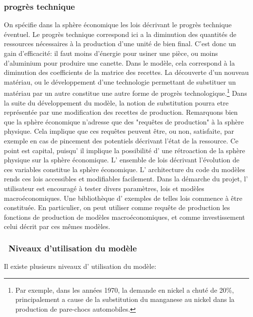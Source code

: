 \documentclass[12pt,a4paper]{article}%
\begin{document}
\subsubsection{{progrès technique}}

On spécifie dans la sphère économique les lois décrivant le progrès
technique éventuel. Le progrès technique correspond ici a la diminution
des quantités de ressources nécessaires à la production d'une unité de
bien final. C'est donc un gain d'efficacité: il faut moins d'énergie pour
usiner une pièce, ou moins d'aluminium pour produire une canette. Dans le
modèle, cela correspond à la diminution des coefficients de la matrice
des recettes. La découverte d'un nouveau matériau, ou le développement d'une
technologie permettant de substituer un matériau par un autre constitue une
autre forme de progrès technologique.\footnote{Par exemple, dans les années
1970, la demande en nickel a chuté de 20\%, principalement a cause de la
substitution du manganese au nickel dans la production de pare-chocs
automobiles\cite{Godard1980}.} Dans la suite du développement du modèle,
la notion de substitution pourra etre représentée par une modification des
recettes de production. Remarquons bien que la sphère économique n'adresse
que des "requêtes de production" à la sphère physique. Cela implique
que ces requêtes peuvent être, ou non, satisfaite, par exemple en cas de
pincement des potentiels décrivant l'état de la ressource. Ce point est
capital, puisqu' il implique la possibilité d' une rétroaction de la
sphère physique sur la sphère économique. L' ensemble de lois
décrivant l'évolution de ces variables constitue la sphère économique. L'
architecture du code du modèles rends ces lois accessibles et modifiables
facilement. Dans la démarche du projet, l' utilisateur est encouragé à
tester divers paramètres, lois et modèles macroéconomiques. Une
bibliothèque d' exemples de telles lois commence à être constituée. En
particulier, on peut utiliser comme requête de production les fonctions de
production de modèles macroéconomiques, et comme investissement celui
décrit par ces mêmes modèles.

\subsubsection{\ Niveaux d'utilisation du modèle}

Il existe plusieurs niveaux d' utilisation du modèle:
\end{document}
